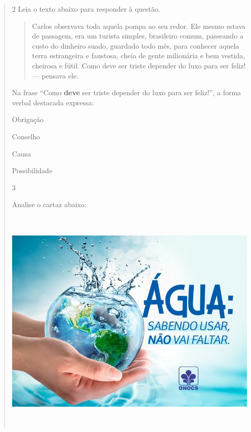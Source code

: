 \begin{quote}
\begin{escolha}
\end{escolha}


\num{2} Leia o texto abaixo para responder à questão. 

\begin{quote}

Carlos observava toda aquela pompa ao seu redor. Ele mesmo estava de passagem,
era um turista simples, brasileiro comum, passeando a custo do dinheiro suado, 
guardado todo mês, para conhecer aquela terra estrangeira e faustosa, cheia de 
gente milionária e bem vestida, cheirosa e fútil. Como deve ser triste depender
do luxo para ser feliz! --- pensava ele.     

\end{quote}


Na frase ``Como \textbf{deve} ser triste depender do luxo para ser feliz!'', 
a forma verbal destacada expressa:

\begin{escolha}
  
  \item Obrigação
  
  \item Conselho
  
  \item Causa
  
  \item Possibilidade

\end{escolha}


\num{3}

Analise o cartaz abaixo:

\includegraphics[width=5.90551in,height=4.29167in]{./imgSAEB_7_POR/media/image13.png}


\end{quote}
